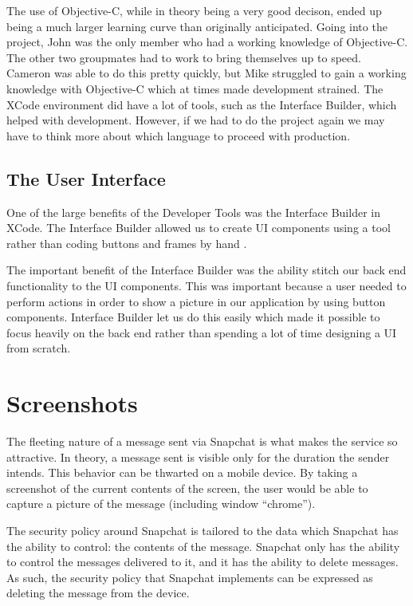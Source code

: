 \documentclass[11pt, a4paper,titlepage]{report}
\begin{document}
The use of Objective-C, while in theory being a very good decison, ended up being a much larger learning curve than originally anticipated. Going into the project, John was the only member who had a working knowledge of Objective-C. The other two groupmates had to work to bring themselves up to speed. Cameron was able to do this pretty quickly, but Mike struggled to gain a working knowledge with Objective-C which at times made development strained. The XCode environment did have a lot of tools, such as the Interface Builder, which helped with development. However, if we had to do the project again we may have to think more about which language to proceed with production.

\subsection*{The User Interface}
One of the large benefits of the Developer Tools was the Interface Builder in XCode. The Interface Builder allowed us to create UI components using a tool rather than coding buttons and frames by hand \cite{Hillegass}.

The important benefit of the Interface Builder was the ability stitch our back end functionality to the UI components. This was important because a user needed to perform actions in order to show a picture in our application by using button components. Interface Builder let us do this easily which made it possible to focus heavily on the back end rather than spending a lot of time designing a UI from scratch.

\section{Screenshots}
The fleeting nature of a message sent via Snapchat is what makes the service so attractive. In theory, a message sent is visible only for the duration the sender intends. This behavior can be thwarted on a mobile device. By taking a screenshot of the current contents of the screen, the user would be able to capture a picture of the message (including window ``chrome'').

The security policy around Snapchat is tailored to the data which Snapchat has the ability to control: the contents of the message. Snapchat only has the ability to control the messages delivered to it, and it has the ability to delete messages. As such, the security policy that Snapchat implements can be expressed as deleting the message from the device.
\end{document}
